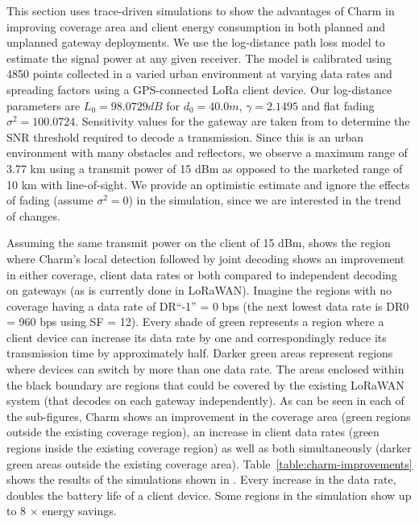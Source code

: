 This section uses trace-driven simulations to show the advantages of Charm in
improving coverage area and client energy consumption in both planned and
unplanned gateway deployments. We use the log-distance path loss model to
estimate the signal power at any given receiver. The model is calibrated using
4850 points collected in a varied urban environment at varying data rates and
spreading factors using a GPS-connected LoRa client device. Our log-distance
parameters are $L_0  = 98.0729 dB$ for $d_0 = 40.0 m$, $\gamma = 2.1495$ and
flat fading $\sigma^2 = 100.0724$. Sensitivity values for the gateway are
taken from \cite{Bor2016} to determine the SNR threshold required to decode a
transmission. Since this is an urban environment with many obstacles and
reflectors, we observe a maximum range of 3.77 km using a transmit power of 15
dBm as opposed to the marketed range of 10 km with line-of-sight. We provide
an optimistic estimate and ignore the effects of fading (assume $\sigma^2 =
0$) in the simulation, since we are interested in the trend of changes.

Assuming the same transmit power on the client of 15 dBm,
 shows the region where Charm's local detection
followed by joint decoding shows an improvement in either coverage, client
data rates or both compared to independent decoding on gateways (as is
currently done in LoRaWAN). Imagine the regions with no coverage having a data
rate of DR``-1'' = 0 bps (the next lowest data rate is DR0 = 960 bps using SF
= 12). Every shade of green represents a region where a client device can
increase its data rate by one and correspondingly reduce its transmission time
by approximately half. Darker green areas represent regions where devices can
switch by more than one data rate. The areas enclosed within the black
boundary are regions that could be covered by the existing LoRaWAN system
(that decodes on each gateway independently). As can be seen in each of the
sub-figures, Charm shows an improvement in the coverage area (green regions
outside the existing coverage region), an increase in client data rates (green
regions inside the existing coverage region) as well as both simultaneously
(darker green areas outside the existing coverage area).
Table~\ref{table:charm-improvements} shows the results of the simulations
shown in . Every increase in the data rate, doubles
the battery life of a client device. Some regions in the simulation show up to
8 $\times$ energy savings.

